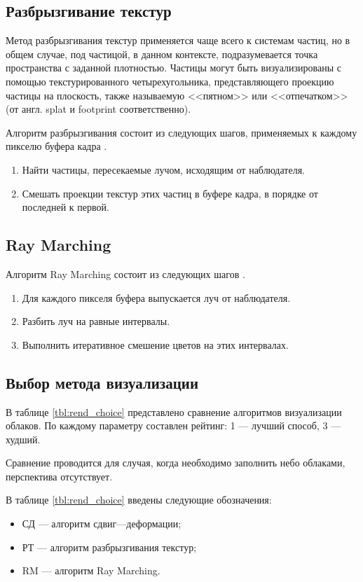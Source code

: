\subsection{Разбрызгивание текстур}
\label{splatting}
Метод разбрызгивания текстур применяется чаще всего к системам частиц, но в общем случае, под частицой, в данном контексте, подразумевается точка пространства с заданной плотностью.
Частицы могут быть визуализированы с помощью текстурированного четырехугольника, представляющего проекцию частицы на плоскость, также называемую <<пятном>> или <<отпечатком>> (от англ. splat и footprint соответственно). 

Алгоритм разбрызгивания состоит из следующих шагов, применяемых к каждому пикселю буфера кадра \cite{voxel, clouds}.
\begin{enumerate}
	\item Найти частицы, пересекаемые лучом, исходящим от наблюдателя.
	\item Смешать проекции текстур этих частиц в буфере кадра, в порядке от последней к первой.
\end{enumerate} 


\subsection{Ray Marching}
\label{ray}

Алгоритм Ray Marching состоит из следующих шагов \cite{hzd, frostbite, clouds}.
\begin{enumerate}
	\item Для каждого пикселя буфера выпускается луч от наблюдателя.
	\item Разбить луч на равные интервалы.
	\item Выполнить итеративное смешение цветов на этих интервалах.
\end{enumerate}


\subsection{Выбор метода визуализации}
В таблице \ref{tbl:rend_choice} представлено сравнение алгоритмов визуализации облаков. По каждому параметру составлен рейтинг: 1 --- лучший способ, 3 --- худший.

Сравнение проводится для случая, когда необходимо заполнить небо облаками, перспектива отсутствует. 

В таблице \ref{tbl:rend_choice} введены следующие обозначения:
\begin{itemize}
	\item СД --- алгоритм сдвиг---деформации;
	\item РТ --- алгоритм разбрызгивания текстур;
	\item RM --- алгоритм Ray Marching.
\end{itemize} 

